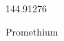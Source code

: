 \documentclass[12pt]{article}
\begin{document}
\hfill{}
\vfill
\begin{center}
  {\fontsize{50}{60}
  }

  \vspace{1em}

  144.91276

Promethium
\end{center}
\vfill
\end{document}
